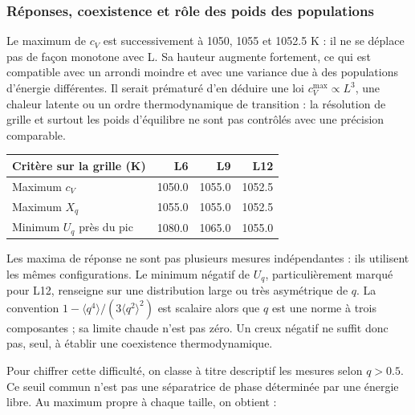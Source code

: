\subsubsection{Réponses, coexistence et rôle des poids des populations}

Le maximum de $c_V$ est successivement à 1050, 1055 et 1052.5 K : il ne se déplace pas de façon monotone avec L. Sa hauteur augmente fortement, ce qui est compatible avec un arrondi moindre et avec une variance due à des populations d’énergie différentes. Il serait prématuré d’en déduire une loi $c_V^{\max}\propto L^3$, une chaleur latente ou un ordre thermodynamique de transition : la résolution de grille et surtout les poids d’équilibre ne sont pas contrôlés avec une précision comparable.

\begin{center}\small\begin{tabular}{lrrr}\toprule

Critère sur la grille (K) & L6 & L9 & L12\\\midrule

Maximum $c_V$ & 1050.0 & 1055.0 & 1052.5\\

Maximum $X_q$ & 1055.0 & 1055.0 & 1052.5\\

Minimum $U_q$ près du pic & 1080.0 & 1065.0 & 1055.0\\

\bottomrule\end{tabular}\end{center}

Les maxima de réponse ne sont pas plusieurs mesures indépendantes : ils utilisent les mêmes configurations. Le minimum négatif de $U_q$, particulièrement marqué pour L12, renseigne sur une distribution large ou très asymétrique de $q$. La convention $1-\langle q^4\rangle/(3\langle q^2\rangle^2)$ est scalaire alors que $q$ est une norme à trois composantes ; sa limite chaude n’est pas zéro. Un creux négatif ne suffit donc pas, seul, à établir une coexistence thermodynamique.


Pour chiffrer cette difficulté, on classe à titre descriptif les mesures selon $q>0.5$. Ce seuil commun n’est pas une séparatrice de phase déterminée par une énergie libre. Au maximum propre à chaque taille, on obtient :


